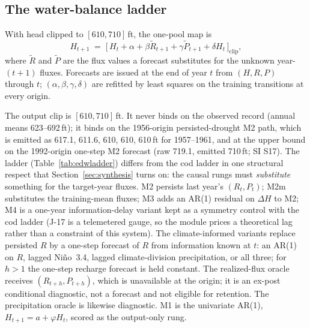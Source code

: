 \subsection{The water-balance ladder}\label{sec:edw_ladder}

\begin{definition}\label{def:pool}
With head clipped to $[610,710]$\,ft, the one-pool map is
\begin{equation}\label{eq:pool}
H_{t+1} \;=\; \bigl[\,H_t + \alpha + \beta\tilde R_{t+1} + \gamma\tilde P_{t+1} + \delta H_t\,\bigr]_{\mathrm{clip}},
\end{equation}
where $\tilde R$ and $\tilde P$ are the flux values a forecast substitutes for the unknown year-$(t+1)$ fluxes. Forecasts are issued at the end of year $t$ from $(H,R,P)$ through $t$; $(\alpha,\beta,\gamma,\delta)$ are refitted by least squares on the training transitions at every origin.
\end{definition}

The output clip is $[610,710]$\,ft. It never binds on the observed record (annual means 623--692\,ft); it binds on the 1956-origin persisted-drought M2 path, which is emitted as 617.1, 611.6, 610, 610, 610\,ft for 1957--1961, and at the upper bound on the 1992-origin one-step M2 forecast (raw 719.1, emitted 710\,ft; SI S17). The ladder (Table~\ref{tab:edwladder}) differs from the cod ladder in one structural respect that Section~\ref{sec:synthesis} turns on: the causal rungs must \emph{substitute} something for the target-year fluxes. M2 persists last year's $(R_t,P_t)$; M2m substitutes the training-mean fluxes; M3 adds an AR(1) residual on $\Delta H$ to M2; M4 is a one-year information-delay variant kept as a symmetry control with the cod ladder (J-17 is a telemetered gauge, so the module prices a theoretical lag rather than a constraint of this system). The climate-informed variants replace persisted $R$ by a one-step forecast of $R$ from information known at $t$: an AR(1) on $R$, lagged Ni\~no~3.4, lagged climate-division precipitation, or all three; for $h>1$ the one-step recharge forecast is held constant. The realized-flux oracle receives $(R_{t+h},P_{t+h})$, which is unavailable at the origin; it is an ex-post conditional diagnostic, not a forecast and not eligible for retention. The precipitation oracle is likewise diagnostic. M1 is the univariate AR(1), $H_{t+1}=a+\varphi H_t$, scored as the output-only rung.

